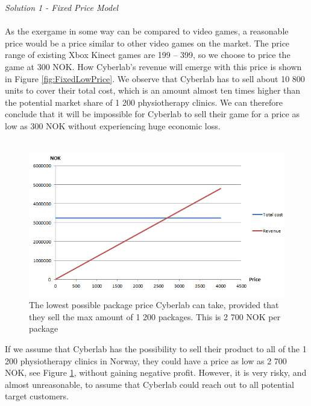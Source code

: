 \emph{Solution 1 - Fixed Price Model}\\ \\
As the exergame in some way can be compared to video games, a reasonable price would be a price similar to other video games on the market. The price range of existing Xbox Kinect games are 199 – 399, so we choose to price the game at 300 NOK. How Cyberlab’s revenue will emerge with this price is shown in Figure \ref{fig:FixedLowPrice}. We observe that Cyberlab has to sell about 10 800 units to cover their total cost, which is an amount almost ten times higher than the potential market share of 1 200 physiotherapy clinics. We can therefore conclude that it will be impossible for Cyberlab to sell their game for a price as low as 300 NOK without experiencing huge economic loss.\\ \\
\begin{figure}
\begin{center}
\includegraphics[scale=0.8]{revenuestreamprice}
\caption[Price example]{The lowest possible package price Cyberlab can take, provided that they sell the max amount of 1 200 packages. This is 2 700 NOK per package}
\label{fig:RevenueStreamPrice}
\end{center}
\end{figure}
If we assume that Cyberlab has the possibility to sell their product to all of the 1 200 physiotherapy clinics in Norway, they could have a price as low as 2 700 NOK, see Figure \ref{fig:RevenueStreamPrice}, without gaining negative profit. However, it is very risky, and almost unreasonable, to assume that Cyberlab could reach out to all potential target customers. \\ \\
